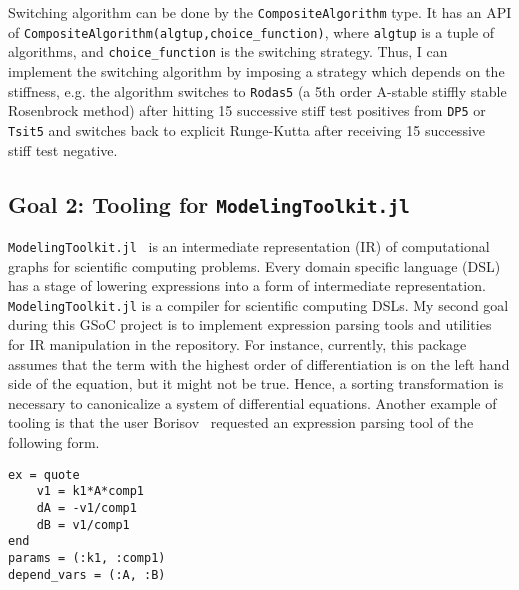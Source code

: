 \documentclass[12pt,a4paper]{article}
\begin{document}
Switching algorithm can be done by the \texttt{CompositeAlgorithm} type. It has
an API of \texttt{CompositeAlgorithm(algtup,choice\_function)}, where
\texttt{algtup} is a tuple of algorithms, and \texttt{choice\_function} is the
switching strategy. Thus, I can implement the switching algorithm by imposing a
strategy which depends on the stiffness, e.g. the algorithm switches to
\texttt{Rodas5} (a 5th order A-stable stiffly stable Rosenbrock method) after
hitting 15 successive stiff test positives from \texttt{DP5} or \texttt{Tsit5}
and switches back to explicit Runge-Kutta after receiving 15 successive stiff
test negative.

\subsection{Goal 2: Tooling for \texttt{ModelingToolkit.jl}}
\texttt{ModelingToolkit.jl}~\cite{modelingtoolkit} is an intermediate
representation (IR) of computational graphs for scientific computing problems.
Every domain specific language (DSL) has a stage of lowering expressions into a
form of intermediate representation. \texttt{ModelingToolkit.jl} is a compiler
for scientific computing DSLs. My second goal during this GSoC project is to
implement expression parsing tools and utilities for IR manipulation in the
repository. For instance, currently, this package assumes that the term with
the highest order of differentiation is on the left hand side of the equation,
but it might not be true. Hence, a sorting transformation is necessary to
canonicalize a system of differential equations. Another example of tooling is
that the user Borisov~\cite{parsing} requested an expression parsing tool of
the following form.
\begin{lstlisting}
ex = quote
    v1 = k1*A*comp1
    dA = -v1/comp1
    dB = v1/comp1
end
params = (:k1, :comp1)
depend_vars = (:A, :B)
\end{lstlisting}
\end{document}
